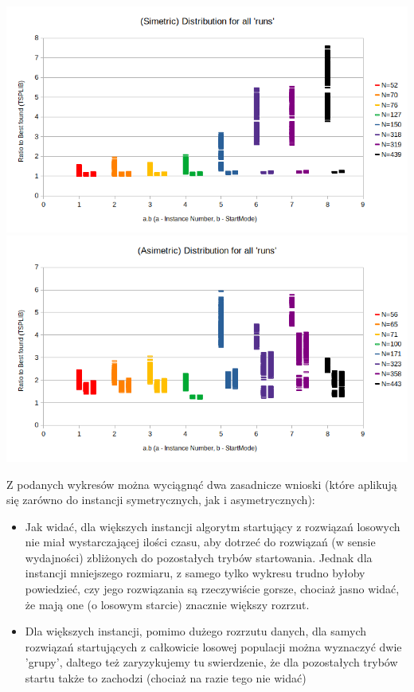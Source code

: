 \documentclass{article}
\begin{document}
\includegraphics[scale=0.36]{simDistI}
\includegraphics[scale=0.36]{asimDistI}

Z podanych wykresów można wyciągnąć dwa zasadnicze wnioski (które aplikują się zarówno do instancji symetrycznych, jak i asymetrycznych):
\begin{itemize}
	\item Jak widać, dla większych instancji algorytm startujący z rozwiązań losowych nie miał wystarczającej ilości czasu, aby dotrzeć do rozwiązań (w sensie wydajności) zbliżonych do pozostałych trybów startowania. Jednak dla instancji mniejszego rozmiaru, z samego tylko wykresu trudno byłoby powiedzieć, czy jego rozwiązania są rzeczywiście gorsze, chociaż  jasno widać, że mają one (o losowym starcie) znacznie większy rozrzut.
	\item Dla większych instancji, pomimo dużego rozrzutu danych, dla samych rozwiązań startujących z całkowicie losowej populacji można wyznaczyć dwie 'grupy', daltego też zaryzykujemy tu swierdzenie, że dla pozostałych trybów startu także to zachodzi (chociaż na razie tego nie widać)
\end{itemize}
\end{document}
